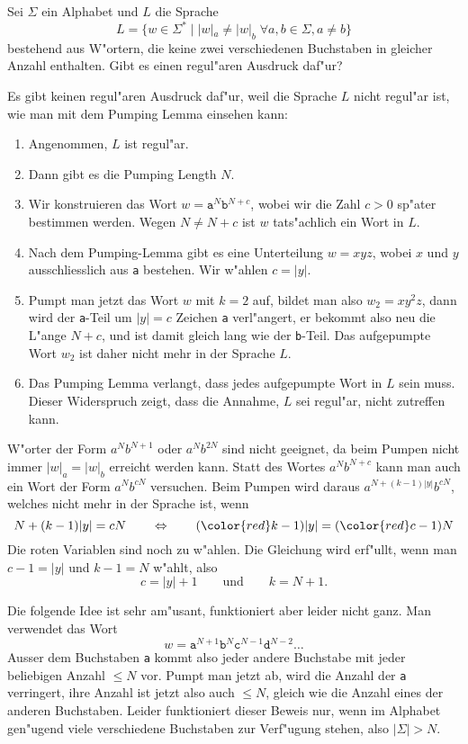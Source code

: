 Sei $\Sigma$ ein Alphabet und $L$ die Sprache
\[
L=\{ w\in\Sigma^* \;|\; |w|_a \ne |w|_b\;\forall a,b\in\Sigma, a\ne b\}
\]
bestehend aus W"ortern, die keine zwei verschiedenen Buchstaben in gleicher
Anzahl enthalten.
Gibt es einen regul"aren Ausdruck daf"ur?

\begin{loesung}
Es gibt keinen regul"aren Ausdruck daf"ur, weil die Sprache $L$ nicht regul"ar
ist, wie man mit dem Pumping Lemma einsehen kann:
\begin{enumerate}
\item Angenommen, $L$ ist regul"ar.
\item Dann gibt es die Pumping Length $N$.
\item Wir konstruieren das Wort $w=\texttt{a}^N\texttt{b}^{N+c}$, wobei
wir die Zahl $c>0$ sp"ater bestimmen werden.
Wegen $N\ne N+c$ ist $w$ tats"achlich ein Wort in $L$.
\item Nach dem Pumping-Lemma gibt es eine Unterteilung $w=xyz$, wobei
$x$ und $y$ ausschliesslich aus \texttt{a} bestehen.
Wir w"ahlen $c=|y|$.
\item Pumpt man jetzt das Wort $w$ mit $k=2$ auf, bildet man also
$w_2=xy^2z$, dann wird der \texttt{a}-Teil um $|y|=c$ Zeichen \texttt{a}
verl"angert, er bekommt also neu die L"ange $N+c$, und ist damit gleich
lang wie der \texttt{b}-Teil.
Das aufgepumpte Wort $w_2$ ist daher nicht mehr in der Sprache $L$.
\item Das Pumping Lemma verlangt, dass jedes aufgepumpte Wort in $L$
sein muss.
Dieser Widerspruch zeigt, dass die Annahme, $L$ sei regul"ar, nicht
zutreffen kann.
\qedhere
\end{enumerate}
\end{loesung}

\begin{diskussion}
W"orter der Form $a^Nb^{N+1}$ oder $a^Nb^{2N}$ sind nicht geeignet, da
beim Pumpen nicht immer $|w|_a=|w|_b$ erreicht werden kann.
Statt des Wortes $a^Nb^{N+c}$ kann man auch ein Wort der Form $a^Nb^{cN}$
versuchen.
Beim Pumpen wird daraus
$a^{N+(k-1)|y|}b^{cN}$, welches nicht mehr in der Sprache ist, wenn
\[
N+(k-1)|y|=cN
\qquad\Leftrightarrow\qquad
({\color{red}k}-1)|y|=({\color{red}c}-1)N
\]
Die {\color{red}roten} Variablen sind noch zu w"ahlen.
Die Gleichung wird erf"ullt, wenn man $c-1=|y|$ und $k-1=N$ w"ahlt, also
\[
c=|y|+1\qquad\text{und}\qquad k=N+1.
\]

Die folgende Idee ist sehr am"usant, funktioniert aber leider nicht ganz.
Man verwendet das Wort
\[
w=\texttt{a}^{N+1}\texttt{b}^N\texttt{c}^{N-1}\texttt{d}^{N-2}\dots
\]
Ausser dem Buchstaben \texttt{a} kommt also jeder andere Buchstabe
mit jeder beliebigen Anzahl $\le N$ vor. 
Pumpt man jetzt ab, wird die Anzahl der \texttt{a} verringert, ihre
Anzahl ist jetzt also auch $\le N$, gleich wie die Anzahl eines der
anderen Buchstaben.
Leider funktioniert dieser Beweis nur, wenn im Alphabet gen"ugend viele
verschiedene Buchstaben zur Verf"ugung stehen, also $|\Sigma| > N$.
\end{diskussion}

